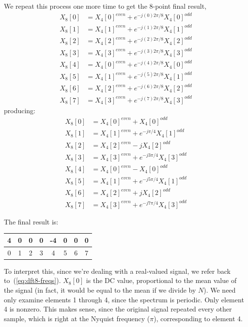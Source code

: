 We repeat this process one more time to get the 8-point final result,
\begin{align*}
  X_8[0] &= X_4[0]^{\mathit{even}} +  e^{-j(0)2\pi/8}X_4[0]^{\mathit{odd}} \\
  X_8[1] &= X_4[1]^{\mathit{even}} +  e^{-j(1)2\pi/8}X_4[1]^{\mathit{odd}} \\
  X_8[2] &= X_4[2]^{\mathit{even}} +  e^{-j(2)2\pi/8}X_4[2]^{\mathit{odd}} \\
  X_8[3] &= X_4[3]^{\mathit{even}} +  e^{-j(3)2\pi/8}X_4[3]^{\mathit{odd}} \\
  X_8[4] &= X_4[0]^{\mathit{even}} +  e^{-j(4)2\pi/8}X_4[0]^{\mathit{odd}} \\
  X_8[5] &= X_4[1]^{\mathit{even}} +  e^{-j(5)2\pi/8}X_4[1]^{\mathit{odd}} \\
  X_8[6] &= X_4[2]^{\mathit{even}} +  e^{-j(6)2\pi/8}X_4[2]^{\mathit{odd}} \\
  X_8[7] &= X_4[3]^{\mathit{even}} +  e^{-j(7)2\pi/8}X_4[3]^{\mathit{odd}}
\end{align*}
producing:
\begin{align*}
  X_8[0] &= X_4[0]^{\mathit{even}} +  X_4[0]^{\mathit{odd}} \\
  X_8[1] &= X_4[1]^{\mathit{even}} +  e^{-j\pi/4}X_4[1]^{\mathit{odd}} \\
  X_8[2] &= X_4[2]^{\mathit{even}} -  j X_4[2]^{\mathit{odd}} \\
  X_8[3] &= X_4[3]^{\mathit{even}} +  e^{-j3\pi/4}X_4[3]^{\mathit{odd}} \\
  X_8[4] &= X_4[0]^{\mathit{even}} -  X_4[0]^{\mathit{odd}} \\
  X_8[5] &= X_4[1]^{\mathit{even}} +  e^{-j5\pi/4}X_4[1]^{\mathit{odd}} \\
  X_8[6] &= X_4[2]^{\mathit{even}} +  jX_4[2]^{\mathit{odd}} \\
  X_8[7] &= X_4[3]^{\mathit{even}} +  e^{-j7\pi/4}X_4[3]^{\mathit{odd}}
\end{align*}

The final result is:
\begin{center}
  \begin{tabular}{|c|c|c|c|c|c|c|c|} \hline
    4   & 0   & 0   & 0   & -4  & 0   & 0   & 0   \\ \hline
    0   & 1   & 2   & 3   & 4   & 5   & 6   & 7   \\ \hline
  \end{tabular}
\end{center}

To interpret this, since we're dealing with a real-valued signal, we
refer back to~(\ref{eq:dft8-freqs}). $X_8[0]$ is the DC value,
proportional to the mean value of the signal (in fact, it would be
equal to the mean if we divide by $N$). We need only examine elements
1 through 4, since the spectrum is periodic. Only element 4 is
nonzero. This makes sense, since the original signal repeated every
other sample, which is right at the Nyquist frequency ($\pi$),
corresponding to element 4.

